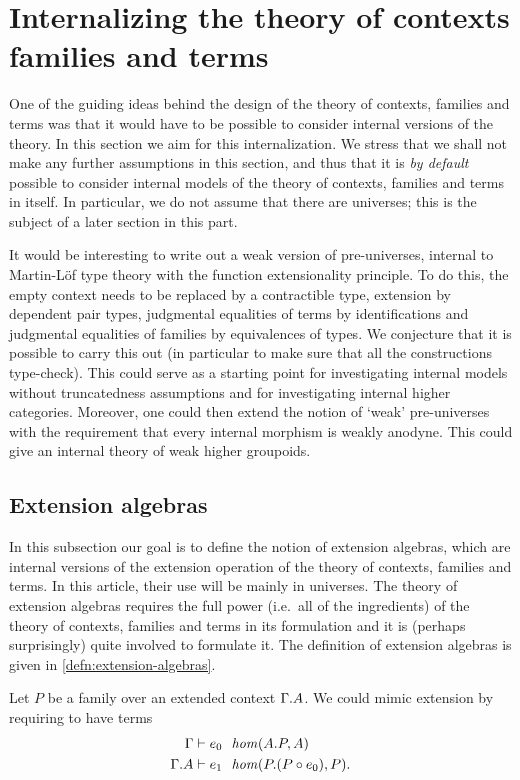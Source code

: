 \section{Internalizing the theory of contexts families and terms}
One of the guiding ideas behind the design of the theory of contexts, families
and terms was that it would have to be possible to consider internal versions
of the theory. In this section we aim for this internalization. We stress that
we shall not make any further assumptions in this section, and thus that
it is \emph{by default} possible to consider internal models of the theory
of contexts, families and terms in itself. In particular, we do not assume that
there are universes; this is the subject of a later section in this part.

It would be interesting to write out a weak version of pre-universes, internal
to Martin-L\"of type theory with the function extensionality principle. 
To do this, the empty context needs to
be replaced by a contractible type, extension by dependent pair types,
judgmental equalities of terms by identifications and judgmental equalities
of families by equivalences of types. We conjecture that it is possible to
carry this out (in particular to make sure that all the constructions 
type-check). This could serve as a starting point for investigating internal
models without truncatedness assumptions and for investigating internal higher
categories. 
Moreover, one could then extend the notion of `weak' pre-universes
with the requirement that every internal morphism is weakly anodyne. This
could give an internal theory of weak higher groupoids.

\subsection{Extension algebras}\label{sec:extension-algebras}
In this subsection our goal is to define the notion of extension algebras,
which are internal versions of the extension operation of the theory of
contexts, families and terms. In this article, their use will be mainly in
universes. The theory of extension algebras requires the full power (i.e.~all
of the ingredients) of the theory of contexts, families and terms in its
formulation and it is (perhaps surprisingly) quite involved to formulate it.
The definition of extension algebras is given in \autoref{defn:extension-algebras}.

Let $P$ be a family over an extended context $\ctxext{\Gamma}{A}$. We could
mimic extension by requiring to have terms
\begin{align*}
\jhom*{\Gamma}{{A}{P}}{A}{e_0}\\
\jhom*{{\Gamma}{A}}{{P}{\jcomp{}{e_0}{P}}}{P}{e_1}.
\end{align*}

